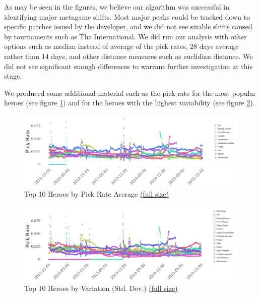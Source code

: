 As may be seen in the figures, we believe our algorithm was successful in identifying major metagame shifts. Most major peaks could be tracked down to specific patches issued by the developer, and we did not see sizable shifts caused by tournaments such as The International. We did run our analysis with other options such as median instead of average of the pick rates, 28 days average rather than 14 days, and other distance measures such as euclidian distance. We did not see significant enough differences to warrant further investigation at this stage.

We produced some additional material such as the pick rate for the most popular heroes (see figure \ref{fig:pick-ratios-top-10-popular-all}) and for the heroes with the highest variability (see figure \ref{fig:pick-ratios-top-10-variation}).

\begin{figure}[h]
    \centering
    \caption{Top 10 Heroes by Pick Rate Average \href{https://raw.githubusercontent.com/marcolussetti/opendotadump-tools/master/prints/picks_most_popular/printout_most_popular_point_15x4_5.png}{(full size)}}
    \label{fig:pick-ratios-top-10-popular-all}
    \includegraphics[width=1\textwidth]{printout_most_popular_point_15x4_5.png}
\end{figure}

\begin{figure}[h]
    \centering
    \caption{Top 10 Heroes by Variation (Std. Dev.) \href{https://raw.githubusercontent.com/marcolussetti/opendotadump-tools/master/prints/picks_highest_variability_heroes/printout_most_variation_point_15x4_5.png}{(full size)}}
    \label{fig:pick-ratios-top-10-variation}
    \includegraphics[width=1\textwidth]{printout_most_variation_point_15x4_5.png}
\end{figure}

